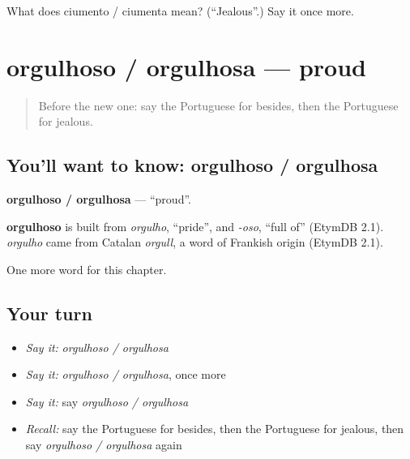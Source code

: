 \begin{tcolorbox}[breakable,colback=teal!4,colframe=teal!35!black,title={Before you move on}]
What does ciumento / ciumenta mean? (\textquotedblleft{}Jealous\textquotedblright{}.) Say it once more.
\end{tcolorbox}
\section[orgulhoso / orgulhosa]{orgulhoso / orgulhosa — proud}

\label{lesson:PT-C215-orgulhoso-orgulhosa}



\begin{quote}
Before the new one: say the Portuguese for besides, then the Portuguese for jealous.
\end{quote}

\subsection*{You'll want to know: orgulhoso / orgulhosa}
\textbf{orgulhoso / orgulhosa} — \textquotedblleft{}proud\textquotedblright{}.

\begin{cousinweb}
\textbf{orgulhoso} is built from \emph{orgulho}, \textquotedblleft{}pride\textquotedblright{}, and \emph{-oso}, \textquotedblleft{}full of\textquotedblright{} (EtymDB 2.1). \emph{orgulho} came from Catalan \emph{orgull}, a word of Frankish origin (EtymDB 2.1).
\end{cousinweb}

\begin{grammarlens}[title={What you've built}]
One more word for this chapter.
\end{grammarlens}

\subsection*{Your turn}
\begin{itemize}
\raggedright
  \item \emph{Say it:} \emph{orgulhoso / orgulhosa}
  \item \emph{Say it:} \emph{orgulhoso / orgulhosa}, once more
  \item \emph{Say it:} say \emph{orgulhoso / orgulhosa}
  \item \emph{Recall:} say the Portuguese for besides, then the Portuguese for jealous, then say \emph{orgulhoso / orgulhosa} again
\end{itemize}

